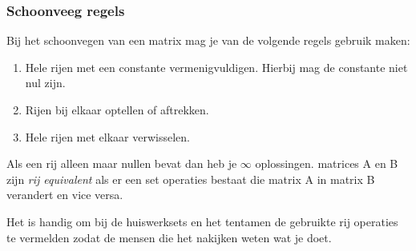 \subsubsection{Schoonveeg regels}
Bij het schoonvegen van een matrix mag je van de volgende regels gebruik maken:
\begin{enumerate}
	\item Hele rijen met een constante vermenigvuldigen. Hierbij mag de constante niet nul zijn.
	\item Rijen bij elkaar optellen of aftrekken.
	\item Hele rijen met elkaar verwisselen.
\end{enumerate}
Als een rij alleen maar nullen bevat dan heb je $\infty$ oplossingen. matrices A en B zijn \emph{rij equivalent}  als er een set operaties bestaat die matrix A in matrix B verandert en vice versa.

Het is handig om bij de huiswerksets en het tentamen de gebruikte rij operaties te vermelden zodat de mensen die het nakijken weten wat je doet.

